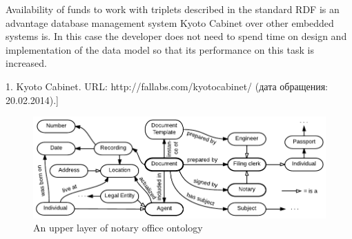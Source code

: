 \documentclass[utf8]{../IncArticle}
\begin{document}
Availability of funds to work with triplets described in the standard RDF is an advantage database management system Kyoto Cabinet over other embedded systems is. In this case the developer does not need to spend time on design and implementation of the data model so that its performance on this task is increased.

1.	Kyoto Cabinet. URL: http://fallabs.com/kyotocabinet/ (дата обращения: 20.02.2014).]







%
%
\begin{figure}[!t]
\centering
\includegraphics[width=\linewidth]{DocumentOntology-en.pdf}
\caption{An upper layer of notary office ontology}
\label{notaryontology}
\end{figure}

\end{document}
